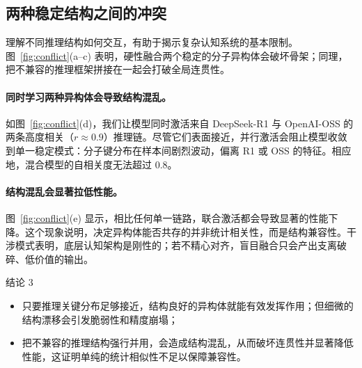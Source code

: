 \subsection{两种稳定结构之间的冲突}

理解不同推理结构如何交互，有助于揭示复杂认知系统的基本限制。图~\ref{fig:conflict}(a–c) 表明，硬性融合两个稳定的分子异构体会破坏骨架；同理，把不兼容的推理框架拼接在一起会打破全局连贯性。\vspace{-8pt}

\paragraph{\textbf{同时学习两种异构体会导致结构混乱。}}
如图~\ref{fig:conflict}(d)，我们让模型同时激活来自 DeepSeek-R1 与 OpenAI-OSS 的两条高度相关（$r \approx 0.9$）推理链。尽管它们表面接近，并行激活会阻止模型收敛到单一稳定模式：分子键分布在样本间剧烈波动，偏离 R1 或 OSS 的特征。相应地，混合模型的自相关度无法超过 0.8。\vspace{-8pt}

\paragraph{\textbf{结构混乱会显著拉低性能。}}
图~\ref{fig:conflict}(e) 显示，相比任何单一链路，联合激活都会导致显著的性能下降。这个现象说明，决定异构体能否共存的并非统计相关性，而是结构兼容性。干涉模式表明，底层认知架构是刚性的；若不精心对齐，盲目融合只会产出支离破碎、低价值的输出。


\begin{TakeawayBox}{结论 3}
\begin{itemize}[leftmargin=16pt, itemsep=0pt, topsep=0pt]
    \item 只要推理关键分布足够接近，结构良好的异构体就能有效发挥作用；但细微的结构漂移会引发脆弱性和精度崩塌；
    \item 把不兼容的推理结构强行并用，会造成结构混乱，从而破坏连贯性并显著降低性能，这证明单纯的统计相似性不足以保障兼容性。
\end{itemize} 
\end{TakeawayBox}
